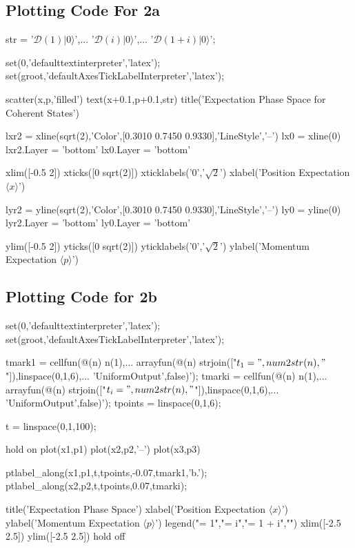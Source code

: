 \subsection*{Plotting Code For 2a}
\begin{python}
str = {'$\mathcal{D}(1)|0\rangle$',...
    '$\mathcal{D}(i)|0\rangle$',...
    '$\mathcal{D}(1+i)|0\rangle$'};

set(0,'defaulttextinterpreter','latex');
set(groot,'defaultAxesTickLabelInterpreter','latex');

scatter(x,p,'filled')
text(x+0.1,p+0.1,str)
title('Expectation Phase Space for Coherent States')

lxr2 = xline(sqrt(2),'Color',[0.3010 0.7450 0.9330],'LineStyle','--')
lx0 = xline(0)
lxr2.Layer = 'bottom'
lx0.Layer = 'bottom'

xlim([-0.5 2])
xticks([0 sqrt(2)])
xticklabels({'0','$\sqrt{2}$'})
xlabel('Position Expectation $\langle x \rangle$')

lyr2 = yline(sqrt(2),'Color',[0.3010 0.7450 0.9330],'LineStyle','--')
ly0 = yline(0)
lyr2.Layer = 'bottom'
ly0.Layer = 'bottom'

ylim([-0.5 2])
yticks([0 sqrt(2)])
yticklabels({'0','$\sqrt{2}$'})
ylabel('Momentum Expectation $\langle p \rangle$')
\end{python}
\newpage
\subsection*{Plotting Code for 2b}
\begin{python}
set(0,'defaulttextinterpreter','latex');
set(groot,'defaultAxesTickLabelInterpreter','latex');

tmark1 = cellfun(@(n) n(1),...
    arrayfun(@(n) strjoin(["$t_1=",num2str(n),"$"]),linspace(0,1,6),...
    'UniformOutput',false)');
tmarki = cellfun(@(n) n(1),...
    arrayfun(@(n) strjoin(["$t_i=",num2str(n),"$"]),linspace(0,1,6),...
    'UniformOutput',false)');
tpoints = linspace(0,1,6);

t = linspace(0,1,100);

hold on
plot(x1,p1)
plot(x2,p2,'--')
plot(x3,p3)

ptlabel_along(x1,p1,t,tpoints,-0.07,tmark1,'b.');
ptlabel_along(x2,p2,t,tpoints,0.07,tmarki);

title('Expectation Phase Space')
xlabel('Position Expectation $\langle x \rangle$')
ylabel('Momentum Expectation $\langle p \rangle$')
legend("\alpha = 1","\alpha = i","\alpha = 1 + i","")
xlim([-2.5 2.5])
ylim([-2.5 2.5])
hold off
\end{python}
